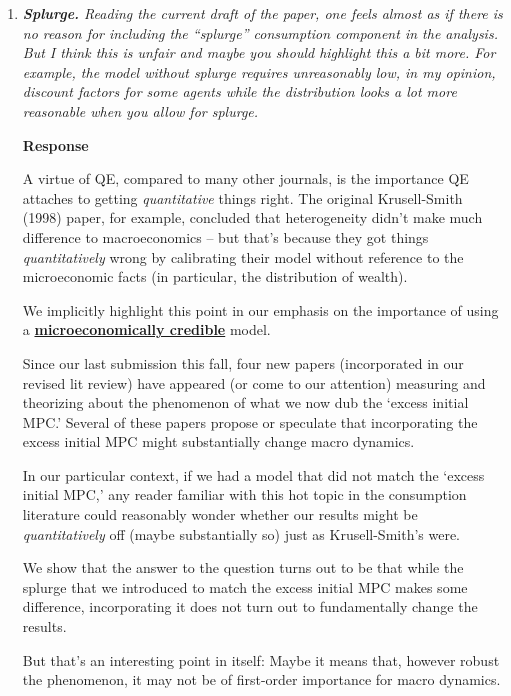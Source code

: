 \documentclass[12pt,letterpaper,english]{article}
\begin{document}
\begin{enumerate}
	
\item \textit{\textbf{Splurge.} Reading the current draft of the paper, one feels almost as if there is	no reason for including the ``splurge'' consumption component in the analysis. But I think this is unfair and maybe you should highlight this a bit more. For example, the model without splurge requires unreasonably low, in my opinion, discount factors	for some agents while the distribution looks a lot more reasonable when you allow for splurge.}

  \noindent \textbf{Response}

  A virtue of QE, compared to many other journals, is the importance QE attaches to getting \textit{quantitative} things right.  The original Krusell-Smith (1998) paper, for example, concluded that heterogeneity didn't make much difference to macroeconomics -- but that's because they got things \textit{quantitatively} wrong by calibrating their model without reference to the microeconomic facts (in particular, the distribution of wealth).

  We implicitly highlight this point in our emphasis on the importance of using a \href{https://llorracc.github.io/HAFiscal/#microeconomically-credible}{\textbf{microeconomically credible}} model.

  Since our last submission this fall, four new papers (incorporated in our revised lit review) have appeared (or come to our attention) measuring and theorizing about the phenomenon of what we now dub the `excess initial MPC.'  Several of these papers propose or speculate that incorporating the excess initial MPC might substantially change macro dynamics.

  In our particular context, if we had a model that did not match the `excess initial MPC,' any reader familiar with this hot topic in the consumption literature could reasonably wonder whether our results might be \textit{quantitatively} off (maybe substantially so) just as Krusell-Smith's were.

  We show that the answer to the question turns out to be that while the splurge that we introduced to match the excess initial MPC makes some difference, incorporating it does not turn out to fundamentally change the results.

  But that's an interesting point in itself: Maybe it means that, however robust the phenomenon, it may not be of first-order importance for macro dynamics.
  

\end{enumerate}
\end{document}
